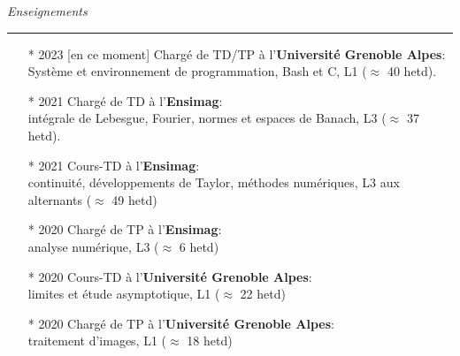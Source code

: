 \documentclass[a4paper,10pt, french]{article}
\begin{document}
\noindent
\textit{\Large \color{MyGray} \hspace{5mm} Enseignements}
\vspace{2mm}
{\color{DefaultGray}\hrule height .1pt}
\vspace{4mm}

\begin{itemize}
	\setlength\itemsep{3mm}
	\item[*] 2023 [en ce moment] Chargé de TD/TP à l'\textbf{Université Grenoble Alpes}:\\
	Système et environnement de programmation, Bash et C, L1 ($\approx$ 40 hetd).
	\item[*] 2021 Chargé de TD à l'\textbf{Ensimag}:\\
	intégrale de Lebesgue, Fourier, normes et espaces de Banach, L3 ($\approx$ 37 hetd).
	\item[*] 2021 Cours-TD à l'\textbf{Ensimag}:\\
	continuité, développements de Taylor, méthodes numériques, L3 aux alternants ($\approx$ 49 hetd)
	\item[*] 2020 Chargé de TP à l'\textbf{Ensimag}:\\ analyse numérique, L3 ($\approx$ 6 hetd)
	\item[*] 2020 Cours-TD à l'\textbf{Université Grenoble Alpes}:\\
	limites et étude asymptotique, L1 ($\approx$ 22 hetd)
	\item[*] 2020 Chargé de TP à l'\textbf{Université Grenoble Alpes}:\\
	traitement d'images, L1 ($\approx$ 18 hetd)
\end{itemize}
\end{document}
